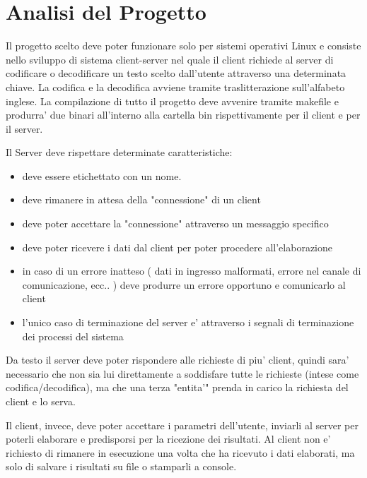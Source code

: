 \documentclass[12pt]{article}
\begin{document}


\section{Analisi del Progetto}
Il progetto scelto deve poter funzionare solo per sistemi operativi Linux e consiste nello sviluppo di sistema client-server  nel quale il client richiede al server di codificare o decodificare un testo scelto dall'utente attraverso una determinata chiave. La codifica e la decodifica avviene tramite traslitterazione sull'alfabeto inglese. La compilazione di tutto il progetto deve avvenire tramite makefile e produrra' due binari all'interno alla cartella bin rispettivamente per il client e per il server.

Il Server deve rispettare determinate caratteristiche:
\begin{itemize}
    \item deve essere etichettato con un nome.
    \item deve rimanere in attesa della "connessione" di un client
    \item deve poter accettare la "connessione" attraverso un messaggio specifico
    \item deve poter ricevere i dati dal client per poter procedere all'elaborazione
    \item in caso di un errore inatteso ( dati in ingresso malformati, errore nel canale di comunicazione, ecc.. ) deve produrre un errore opportuno e comunicarlo al client 
    \item l'unico caso di terminazione del server e' attraverso i segnali di terminazione dei processi del sistema
\end{itemize}

Da testo il server deve poter rispondere alle richieste di piu' client, quindi sara' necessario che non sia lui direttamente a soddisfare tutte le richieste (intese come codifica/decodifica), ma che una terza "entita'" prenda in carico la richiesta del client e lo serva.

Il client, invece, deve poter accettare i parametri dell'utente, inviarli al server per poterli elaborare e predisporsi per la ricezione dei risultati. Al client non e' richiesto di rimanere in esecuzione una volta che ha ricevuto i dati elaborati, ma solo di salvare i risultati su file o stamparli a console.
\vspace*{2cm}
\end{document}
